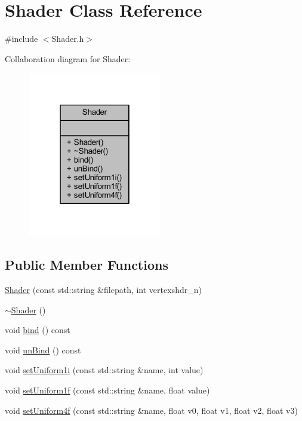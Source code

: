 \hypertarget{class_shader}{}\section{Shader Class Reference}
\label{class_shader}


{\ttfamily \#include $<$Shader.\+h$>$}



Collaboration diagram for Shader\+:
\nopagebreak
\begin{figure}[H]
\begin{center}
\leavevmode
\includegraphics[width=166pt]{class_shader__coll__graph}
\end{center}
\end{figure}
\subsection*{Public Member Functions}
\begin{DoxyCompactItemize}
\item 
\mbox{\hyperlink{class_shader_a493fba969a782cf9e15e2c88933f653a}{Shader}} (const std\+::string \&filepath, int vertexshdr\+\_\+n)
\item 
\mbox{\hyperlink{class_shader_aff01df87e8a102f270b5b135a295e59d}{$\sim$\+Shader}} ()
\item 
void \mbox{\hyperlink{class_shader_aadbc0ca0d899238d547f87f19461dfeb}{bind}} () const
\item 
void \mbox{\hyperlink{class_shader_a37c4daec03eb3273ba220ab6cddb4c76}{un\+Bind}} () const
\item 
void \mbox{\hyperlink{class_shader_a6a3ad7b19c1b78b851a21dcfb69ed6c2}{set\+Uniform1i}} (const std\+::string \&name, int value)
\item 
void \mbox{\hyperlink{class_shader_a514a718cd4afdbe525cc977963d46c54}{set\+Uniform1f}} (const std\+::string \&name, float value)
\item 
void \mbox{\hyperlink{class_shader_a4580a5874d65651a6632d497f9675934}{set\+Uniform4f}} (const std\+::string \&name, float v0, float v1, float v2, float v3)
\end{DoxyCompactItemize}


